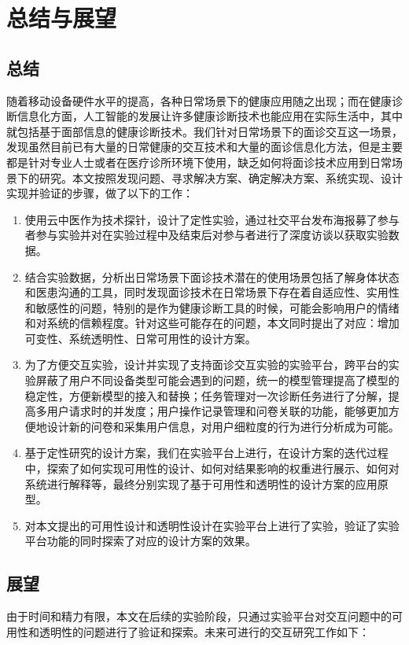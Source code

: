\chapter{总结与展望}
\section{总结}
随着移动设备硬件水平的提高，各种日常场景下的健康应用随之出现；而在健康诊断信息化方面，人工智能的发展让许多健康诊断技术也能应用在实际生活中，其中就包括基于面部信息的健康诊断技术。我们针对日常场景下的面诊交互这一场景，发现虽然目前已有大量的日常健康的交互技术和大量的面诊信息化方法，但是主要都是针对专业人士或者在医疗诊所环境下使用，缺乏如何将面诊技术应用到日常场景下的研究。本文按照发现问题、寻求解决方案、确定解决方案、系统实现、设计实现并验证的步骤，做了以下的工作：

\begin{enumerate}
	\item 使用云中医作为技术探针，设计了定性实验，通过社交平台发布海报募了参与者参与实验并对在实验过程中及结束后对参与者进行了深度访谈以获取实验数据。
	
	\item 结合实验数据，分析出日常场景下面诊技术潜在的使用场景包括了解身体状态和医患沟通的工具，同时发现面诊技术在日常场景下存在着自适应性、实用性和敏感性的问题，特别的是作为健康诊断工具的时候，可能会影响用户的情绪和对系统的信赖程度。针对这些可能存在的问题，本文同时提出了对应：增加可变性、系统透明性、日常可用性的设计方案。

	\item 为了方便交互实验，设计并实现了支持面诊交互实验的实验平台，跨平台的实验屏蔽了用户不同设备类型可能会遇到的问题，统一的模型管理提高了模型的稳定性，方便新模型的接入和替换；任务管理对一次诊断任务进行了分解，提高多用户请求时的并发度；用户操作记录管理和问卷关联的功能，能够更加方便地设计新的问卷和采集用户信息，对用户细粒度的行为进行分析成为可能。
	
	\item 基于定性研究的设计方案，我们在实验平台上进行，在设计方案的迭代过程中，探索了如何实现可用性的设计、如何对结果影响的权重进行展示、如何对系统进行解释等，最终分别实现了基于可用性和透明性的设计方案的应用原型。

	\item 对本文提出的可用性设计和透明性设计在实验平台上进行了实验，验证了实验平台功能的同时探索了对应的设计方案的效果。
\end{enumerate}




\section{展望}
由于时间和精力有限，本文在后续的实验阶段，只通过实验平台对交互问题中的可用性和透明性的问题进行了验证和探索。未来可进行的交互研究工作如下：

